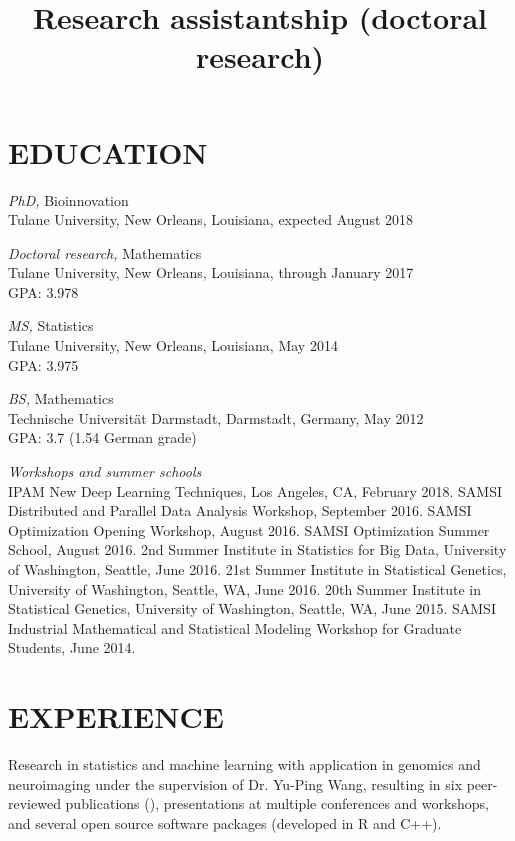 \documentclass[overlapped, line, 10pt]{res} %
\begin{document}
\begin{resume}

\section{EDUCATION}

{\sl PhD,} Bioinnovation \\
Tulane University, New Orleans, Louisiana, expected August 2018

{\sl Doctoral research,} Mathematics \\
Tulane University, New Orleans, Louisiana, through January 2017\\
GPA: 3.978

{\sl MS,} Statistics \\
Tulane University, New Orleans, Louisiana, May 2014\\
GPA: 3.975

{\sl BS,} Mathematics\\
Technische Universit\"{a}t Darmstadt, Darmstadt, Germany, May 2012\\
GPA: 3.7 (1.54 German grade)

{\sl Workshops and summer schools}\\
IPAM New Deep Learning Techniques, Los Angeles, CA, February 2018.
SAMSI Distributed and Parallel Data Analysis Workshop, September 2016.
SAMSI Optimization Opening Workshop, August 2016.
SAMSI Optimization Summer School, August 2016.
2nd Summer Institute in Statistics for Big Data, University of Washington, Seattle, June 2016.
21st Summer Institute in Statistical Genetics, University of Washington, Seattle, WA, June 2016.
20th Summer Institute in Statistical Genetics, University of Washington, Seattle, WA, June 2015.
SAMSI Industrial Mathematical and Statistical Modeling Workshop for Graduate Students, June 2014.


\section{EXPERIENCE}

\title{Research assistantship (doctoral research)}
\begin{position}
  Research in statistics and machine learning with application in genomics and neuroimaging under the supervision of Dr. Yu-Ping Wang, resulting in six peer-reviewed publications (\cite{gossmann2015, cao2015BCB, cao2015bioinformatics, Gossmann2017-yu, Gossmann2017-ln, brzyski2016}), presentations at multiple conferences and workshops, and several open source software packages (developed in R and C++).
\end{position}


\end{resume}
\end{document}
